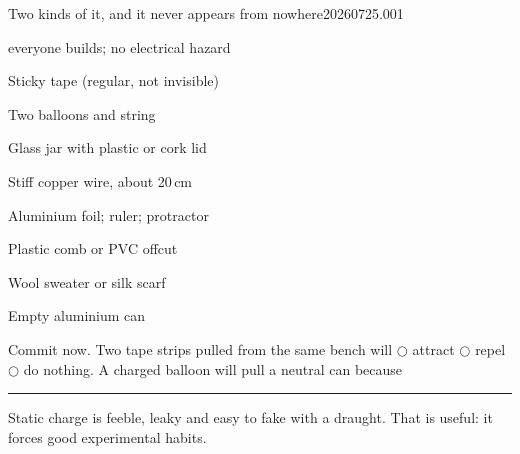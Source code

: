

  {Two kinds of it, and it never appears from nowhere}{20260725.001}


  {everyone builds; no electrical hazard}

\begin{materials}
\item Sticky tape (regular, not invisible)
\item Two balloons and string
\item Glass jar with plastic or cork lid
\item Stiff copper wire, about 20\,cm
\item Aluminium foil; ruler; protractor
\item Plastic comb or PVC offcut
\item Wool sweater or silk scarf
\item Empty aluminium can
\end{materials}

\begin{predict}
Commit now. Two tape strips pulled from the same bench will
\(\bigcirc\) attract \(\bigcirc\) repel \(\bigcirc\) do nothing. A charged
balloon will pull a neutral can because \rule{.42\linewidth}{.3pt}
\end{predict}


Static charge is feeble, leaky and easy to fake with a draught. That is useful:
it forces good experimental habits.

\begin{center}
\end{center}

